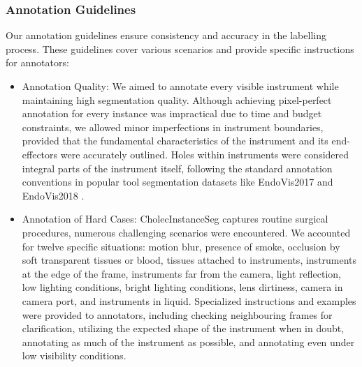 \subsubsection*{Annotation Guidelines}
Our annotation guidelines ensure consistency and accuracy in the labelling process. These guidelines cover various scenarios and provide specific instructions for annotators:
%
%
%
\begin{itemize}
    \item Annotation Quality: We aimed to annotate every visible instrument while maintaining high segmentation quality. Although achieving pixel-perfect annotation for every instance was impractical due to time and budget constraints, we allowed minor imperfections in instrument boundaries, provided that the fundamental characteristics of the instrument and its end-effectors were accurately outlined. Holes within instruments were considered integral parts of the instrument itself, following the standard annotation conventions in popular tool segmentation datasets like EndoVis2017 \cite{endovis2017} and EndoVis2018 \cite{endovis2018}.
    \item Annotation of Hard Cases:  CholecInstanceSeg captures routine surgical procedures, numerous challenging scenarios were encountered. We accounted for twelve specific situations: motion blur, presence of smoke, occlusion by soft transparent tissues or blood, tissues attached to instruments, instruments at the edge of the frame, instruments far from the camera, light reflection, low lighting conditions, bright lighting conditions, lens dirtiness, camera in camera port, and instruments in liquid.
    Specialized instructions and examples were provided to annotators, including checking neighbouring frames for clarification, utilizing the expected shape of the instrument when in doubt, annotating as much of the instrument as possible, and annotating even under low visibility conditions. 
\end{itemize}




